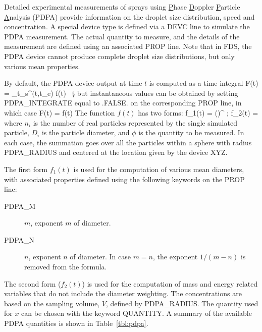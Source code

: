 \documentclass[11pt]{book}
\begin{document}
Detailed experimental measurements of sprays using \underline{P}hase \underline{D}oppler \underline{P}article
\underline{A}nalysis (PDPA) provide information on the droplet size distribution, speed and concentration.
A special device type is defined via a {\ct DEVC} line to simulate the PDPA measurement. The actual quantity to measure, and the details of the
measurement are defined using an associated {\ct PROP} line. Note that in FDS, the PDPA device cannot produce complete droplet size
distributions, but only various mean properties.

By default, the PDPA device output at time $t$ is computed as a time integral
\be
F(t) =  \int_{t_{\rm s}}^{\min(t,t_{\rm e})} f(t) \, \d t
\ee
but instantaneous values can be obtained by setting {\ct PDPA\_INTEGRATE} equal to {\ct .FALSE.} on the corresponding {\ct PROP} line, in which case
\be
F(t) = f(t)
\ee
The function $f(t)$ has two forms:
\be
f_1(t) =  \left(\right)^{}
\quad ; \quad
f_2(t) = 
\ee
where $n_i$ is the number of real particles represented by the single simulated particle, $D_i$
is the particle diameter, and $\phi$ is the quantity to be measured. In each case, the summation goes over all the particles within a sphere
with radius {\ct PDPA\_RADIUS} and centered at the location given by the device {\ct XYZ}.

The first form $f_1(t)$ is used for the computation of various mean diameters, with
associated properties defined using the following keywords on the {\ct PROP} line:
\begin{description}
\item[{\ct PDPA\_M}] $m$, exponent $m$ of diameter.
\item[{\ct PDPA\_N}] $n$, exponent $n$ of diameter. In case $m=n$, the exponent $1/(m-n)$ is removed from the formula.
\end{description}
The second form ($f_2(t)$) is used for the computation of mass and energy related variables that do not include the diameter weighting.
The concentrations are based on the sampling volume, $V$, defined by {\ct PDPA\_RADIUS}.
The quantity used for $x$ can be chosen with the keyword {\ct QUANTITY}.
A summary of the available PDPA quantities is shown in Table~\ref{tbl:pdpa}.
\end{document}
